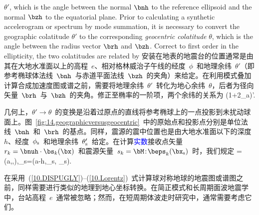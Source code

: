 $\theta'$, which is the angle between the normal $\bnh$ to
the reference ellipsoid and the normal $\bzh$ to the equatorial
plane.  Prior to calculating a synthetic accelerogram or spectrum
by mode summation,
it is necessary to convert the geographic colatitude $\theta'$ to
the corresponding {\em geocentric colatitude\/} $\theta$, which is
the angle between the radius vector $\brh$ and $\bzh$.
Correct to first order in the ellipticity, the two
colatitudes are related by
\fi
安装在地表的地震台的位置通常是由其在大地水准面以上的高程~$e$、相对格林威治子午线的经度~$\phi$~和地理余纬~$\theta'$（即参考椭球体法线~$\bnh$~与赤道平面法线~$\bzh$~的夹角）来给定。在利用模式叠加计算合成加速度图或谱之前，需要将地理余纬~$\theta'$~转化为地心余纬~$\theta$，后者为径向矢量~$\brh$~与~$\bzh$~的夹角。修正至椭率的一阶项，两个余纬的关系为
\eq
\tan\theta\approx (1+2\eps_{\rm a})\tan\theta'.
\en

几何上，$\theta'\rightarrow\theta$~的变换是沿着过原点的直线将参考椭球上的一点投影到未扰动球面上。图~\ref{fig:14.geographicversusgeocentric}~中的原始点和投影点分别是单位法线~$\bnh$~和~$\brh$~的基点。同样，震源的震中位置也是由大地水准面以下的深度~$h$、经度~$\phi_{\rm s}$~和地理余纬~$\theta^{\prime}_{\rm s}$~给定。在计算\textcolor{blue}{实数}接收点矢量~$r_k=\bnuh\cdot\bs_k(\bx)$~和震源矢量~$s_k=\bM\!:\!\beps_k(\bx_{\rm s})$~时，我们规定
\eq
\bx=(a,\theta,\phi),\qquad\bx_{\rm s}=(a-h,\theta_{\rm s},
\phi_{\rm s}).
\en

在采用~(\ref{10.DISPUGLY})--(\ref{10.Lorentz})~式计算球对称地球的地震图或谱图之前，同样需要进行类似的地理到地心坐标转换。在简正模式和长周期面波地震学中，台站高程~$e$~通常被忽略；然而，在短周期体波走时研究中，通常需要考虑它们。
%
%
%
%
%
%

